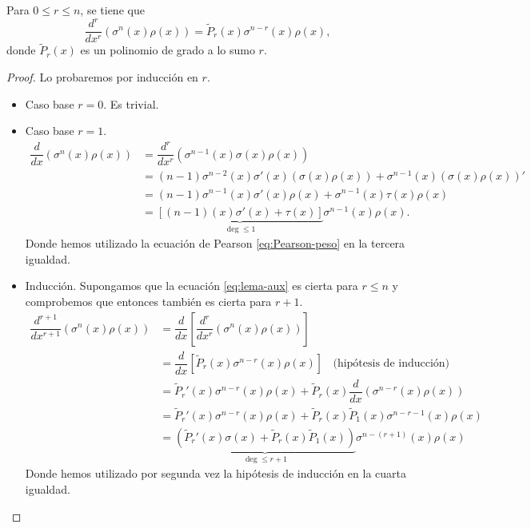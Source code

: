 \begin{lema}
    \label{lema:derivadas-raras}
    Para $0\leq r \leq n$, se tiene que
    \begin{equation}
        \label{eq:lema-aux}
        \dfrac{d^{r}}{dx^{r}}(\sigma^n(x)\rho(x))=\tilde{P}_r(x)\sigma^{n-r}(x)\rho(x),
    \end{equation}
    donde $\tilde{P}_r(x)$ es un polinomio de grado a lo sumo $r$.
\end{lema}
\begin{proof}
    Lo probaremos por inducción en $r$.
    \begin{itemize}
        \item Caso base $r=0$. Es trivial.
        \item Caso base $r=1$. 
        \begin{equation*}
            \begin{split}
                \dfrac{d}{dx}(\sigma^n(x)\rho(x)) &= \dfrac{d^{r}}{dx^{r}}(\sigma^{n-1}(x)\sigma(x)\rho(x)) \\
                &= (n-1)\sigma^{n-2}(x)\sigma'(x)(\sigma(x)\rho(x)) + \sigma^{n-1}(x)(\sigma(x)\rho(x))' \\
                &= (n-1)\sigma^{n-1}(x)\sigma'(x)\rho(x) + \sigma^{n-1}(x)\tau(x)\rho(x) \\
                &= \underbrace{\left[(n-1)(x)\sigma'(x) + \tau(x)\right]}_{\deg \leq 1}\sigma^{n-1}(x)\rho(x).
            \end{split}
        \end{equation*}
        Donde hemos utilizado la ecuación de Pearson \eqref{eq:Pearson-peso} en la tercera igualdad.
        \item Inducción. Supongamos que la ecuación \eqref{eq:lema-aux} es cierta para $r\leq n$ y comprobemos que entonces también es cierta para $r+1$.
        \begin{equation*}
            \begin{split}
                \dfrac{d^{r+1}}{dx^{r+1}}(\sigma^n(x)\rho(x)) &= \dfrac{d}{dx}\left[\dfrac{d^{r}}{dx^{r}}(\sigma^n(x)\rho(x))\right] \\
                &= \dfrac{d}{dx}\left[\tilde{P}_r(x)\sigma^{n-r}(x)\rho(x)\right] \ \ \ \ \text{(hipótesis de inducción)} \\
                &= \tilde{P}_r'(x)\sigma^{n-r}(x)\rho(x) + \tilde P_r(x) \dfrac{d}{dx}(\sigma^{n-r}(x)\rho(x)) \\
                &= \tilde{P}_r'(x)\sigma^{n-r}(x)\rho(x) + \tilde P_r(x)\tilde P_1(x)\sigma^{n-r-1}(x)\rho(x) \\
                &=  \underbrace{\left(\tilde{P}_r'(x)\sigma(x) + \tilde P_r(x)\tilde P_1(x)\right)}_{\deg \leq r+1}\sigma^{n-(r+1)}(x)\rho(x)
            \end{split}
        \end{equation*}
        Donde hemos utilizado por segunda vez la hipótesis de inducción en la cuarta igualdad.
    \end{itemize}
\end{proof}

